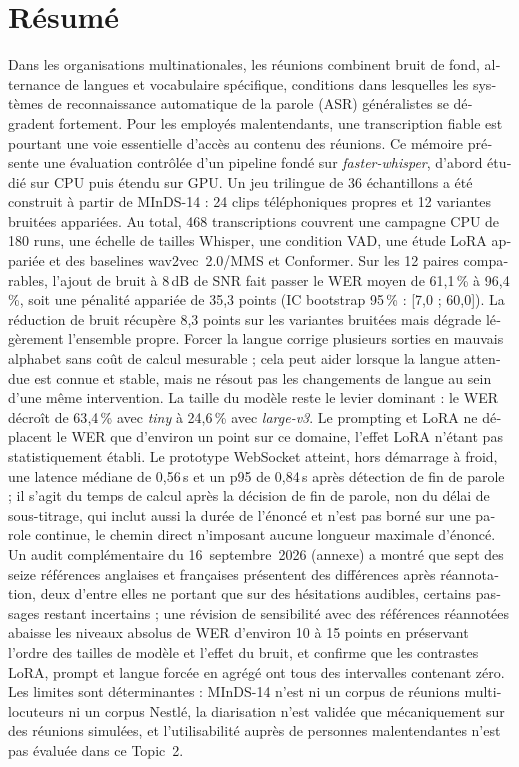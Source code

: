 \documentclass[12pt]{report}
\begin{document}
\section*{Résumé}
{}
\begin{otherlanguage}{french}
Dans les organisations multinationales, les réunions combinent bruit de fond, alternance de langues et vocabulaire spécifique, conditions dans lesquelles les systèmes de reconnaissance automatique de la parole (ASR) généralistes se dégradent fortement. Pour les employés malentendants, une transcription fiable est pourtant une voie essentielle d'accès au contenu des réunions. Ce mémoire présente une évaluation contrôlée d'un pipeline fondé sur \textit{faster-whisper}, d'abord étudié sur CPU puis étendu sur GPU. Un jeu trilingue de 36 échantillons a été construit à partir de MInDS-14 : 24 clips téléphoniques propres et 12 variantes bruitées appariées. Au total, 468 transcriptions couvrent une campagne CPU de 180 runs, une échelle de tailles Whisper, une condition VAD, une étude LoRA appariée et des baselines wav2vec~2.0/MMS et Conformer. Sur les 12 paires comparables, l'ajout de bruit à 8\,dB de SNR fait passer le WER moyen de 61{,}1\,\% à 96{,}4\,\%, soit une pénalité appariée de 35{,}3 points (IC bootstrap 95\,\% : [7{,}0 ; 60{,}0]). La réduction de bruit récupère 8{,}3 points sur les variantes bruitées mais dégrade légèrement l'ensemble propre. Forcer la langue corrige plusieurs sorties en mauvais alphabet sans coût de calcul mesurable ; cela peut aider lorsque la langue attendue est connue et stable, mais ne résout pas les changements de langue au sein d'une même intervention. La taille du modèle reste le levier dominant : le WER décroît de 63{,}4\,\% avec \textit{tiny} à 24{,}6\,\% avec \textit{large-v3}. Le prompting et LoRA ne déplacent le WER que d'environ un point sur ce domaine, l'effet LoRA n'étant pas statistiquement établi. Le prototype WebSocket atteint, hors démarrage à froid, une latence médiane de 0{,}56\,s et un p95 de 0{,}84\,s après détection de fin de parole ; il s'agit du temps de calcul après la décision de fin de parole, non du délai de sous-titrage, qui inclut aussi la durée de l'énoncé et n'est pas borné sur une parole continue, le chemin direct n'imposant aucune longueur maximale d'énoncé. Un audit complémentaire du 16~septembre~2026 (annexe) a montré que sept des seize références anglaises et françaises présentent des différences après réannotation, deux d'entre elles ne portant que sur des hésitations audibles, certains passages restant incertains ; une révision de sensibilité avec des références réannotées abaisse les niveaux absolus de WER d'environ 10 à 15 points en préservant l'ordre des tailles de modèle et l'effet du bruit, et confirme que les contrastes LoRA, prompt et langue forcée en agrégé ont tous des intervalles contenant zéro. Les limites sont déterminantes : MInDS-14 n'est ni un corpus de réunions multi-locuteurs ni un corpus Nestlé, la diarisation n'est validée que mécaniquement sur des réunions simulées, et l'utilisabilité auprès de personnes malentendantes n'est pas évaluée dans ce Topic~2.

\end{otherlanguage}
\end{document}

